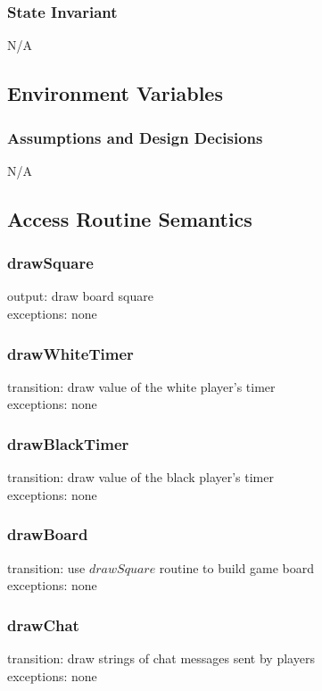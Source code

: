 \documentclass{article}
\begin{document}
        \subsubsection*{State Invariant}
            N/A
            
    \subsection*{Environment Variables}

        \subsubsection*{Assumptions and Design Decisions}
            N/A
            
    \subsection*{Access Routine Semantics}
    
        \subsubsection*{drawSquare}
            output: draw board square \\ 
            exceptions: none 
            
        \subsubsection*{drawWhiteTimer}
            transition: draw value of the white player's timer \\
            exceptions: none 
            
        \subsubsection*{drawBlackTimer}
            transition: draw value of the black player's timer \\
            exceptions: none 
            
        \subsubsection*{drawBoard}
            transition: use $drawSquare$ routine to build game board \\
            exceptions: none 

        \subsubsection*{drawChat}
            transition: draw strings of chat messages sent by players \\
            exceptions: none 
            
\end{document}
